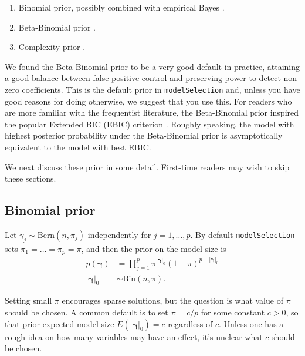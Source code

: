 \documentclass[
]{book}
\newcommand{\bgamma}{\mathbf{\gamma}}
\theoremstyle{definition}
\theoremstyle{definition}
\theoremstyle{definition}
\theoremstyle{definition}
\theoremstyle{remark}
\begin{document}
\begin{enumerate}
\def\labelenumi{\arabic{enumi}.}
\item
  Binomial prior, possibly combined with empirical Bayes \citep{rognon:2025empirical}.
\item
  Beta-Binomial prior \citep{scott:2010}.
\item
  Complexity prior \citep{castillo:2015}.
\end{enumerate}

We found the Beta-Binomial prior to be a very good default in practice, attaining a good balance between false positive control and preserving power to detect non-zero coefficients. This is the default prior in \texttt{modelSelection} and, unless you have good reasons for doing otherwise, we suggest that you use this.
For readers who are more familiar with the frequentist literature, the Beta-Binomial prior inspired the popular Extended BIC (EBIC) criterion \citep{chen:2008}. Roughly speaking, the model with highest posterior probability under the Beta-Binomial prior is asymptotically equivalent to the model with best EBIC.

We next discuss these prior in some detail. First-time readers may wish to skip these sections.

\subsection{Binomial prior}\label{binomial-prior}

Let \(\gamma_j \sim \mbox{Bern}(n, \pi_j)\) independently for \(j=1,\ldots,p\).
By default \texttt{modelSelection} sets \(\pi_1= \ldots = \pi_p= \pi\), and then the prior on the model size is
\begin{align}
p(\bgamma) &= \prod_{j=1}^p \pi^{|\bgamma|_0} (1 - \pi)^{p - |\bgamma|_0}
\\
|\bgamma|_0 &\sim \mbox{Bin}(n,\pi).
\label{eq:bms-binomprior}
\end{align}

Setting small \(\pi\) encourages sparse solutions, but the question is what value of \(\pi\) should be chosen.
A common default is to set \(\pi= c/p\) for some constant \(c>0\), so that prior expected model size \(E(|\bgamma|_0)= c\) regardless of \(c\). Unless one has a rough idea on how many variables may have an effect, it's unclear what \(c\) should be chosen.
\end{document}
